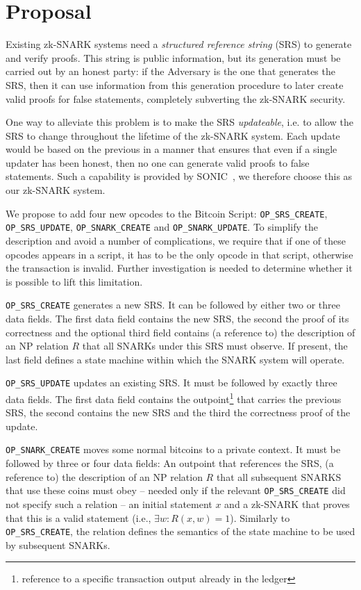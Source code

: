 \section{Proposal}
  Existing zk-SNARK systems need a \emph{structured reference string} (SRS) to
  generate and verify proofs. This string is public information, but its
  generation must be carried out by an honest party: if the Adversary is the one
  that generates the SRS, then it can use information from this generation
  procedure to later create valid proofs for false statements, completely
  subverting the zk-SNARK security.

  One way to alleviate this problem is to make the SRS \emph{updateable}, i.e.
  to allow the SRS to change throughout the lifetime of the zk-SNARK system.
  Each update would be based on the previous in a manner that ensures that even
  if a single updater has been honest, then no one can generate valid proofs to
  false statements. Such a capability is provided by
  SONIC~\cite{DBLP:conf/ccs/MallerBKM19}, we therefore choose this as our
  zk-SNARK system.

  We propose to add four new opcodes to the Bitcoin Script:
  \texttt{OP\_SRS\_CREATE}, \texttt{OP\_SRS\_UPDATE}, \texttt{OP\_SNARK\_CREATE}
  and \texttt{OP\_SNARK\_UPDATE}. To simplify the description and avoid a number
  of complications, we require that if one of these opcodes appears in a script,
  it has to be the only opcode in that script, otherwise the transaction is
  invalid. Further investigation is needed to determine whether it is possible
  to lift this limitation.

  \texttt{OP\_SRS\_CREATE} generates a new SRS. It can be followed by either two
  or three data fields. The first data field contains the new SRS, the second
  the proof of its correctness and the optional third field contains (a
  reference to) the description of an NP relation $R$ that all SNARKs under this
  SRS must observe. If present, the last field defines a state machine within
  which the SNARK system will operate.

  \texttt{OP\_SRS\_UPDATE} updates an existing SRS. It must be followed by
  exactly three data fields. The first data field contains the
  outpoint\footnote{reference to a specific transaction output already in the
  ledger} that carries the previous SRS, the second contains the new SRS and the
  third the correctness proof of the update.

  \texttt{OP\_SNARK\_CREATE} moves some normal bitcoins to a private context. It
  must be followed by three or four data fields: An outpoint that references the
  SRS, (a reference to) the description of an NP relation $R$ that all
  subsequent SNARKS that use these coins must obey -- needed only if the
  relevant \texttt{OP\_SRS\_CREATE} did not specify such a relation -- an
  initial statement $x$ and a zk-SNARK that proves that this is a valid
  statement (i.e., $\exists w: R(x, w) = 1$). Similarly to
  \texttt{OP\_SRS\_CREATE}, the relation defines the semantics of the state
  machine to be used by subsequent SNARKs.


